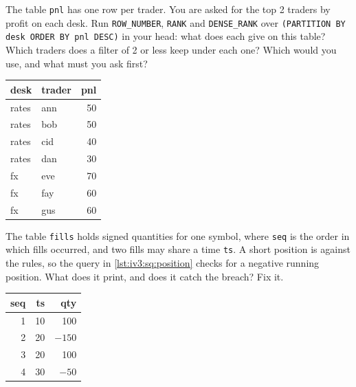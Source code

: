 \begin{question}\label{iq:iv3:sql-and-data:8}
The table \texttt{pnl} has one row per trader. You are asked for the top 2 traders by profit on each desk. Run \texttt{ROW\_NUMBER}, \texttt{RANK} and \texttt{DENSE\_RANK} over \texttt{(PARTITION BY desk ORDER BY pnl DESC)} in your head: what does each give on this table? Which traders does a filter of 2 or less keep under each one? Which would you use, and what must you ask first?
\begin{center}\small
\begin{tabular}{llr}
desk & trader & pnl\\\hline
rates & ann & 50\\
rates & bob & 50\\
rates & cid & 40\\
rates & dan & 30\\
fx & eve & 70\\
fx & fay & 60\\
fx & gus & 60
\end{tabular}
\end{center}
\end{question}

\begin{question}\label{iq:iv3:sql-and-data:9}
The table \texttt{fills} holds signed quantities for one symbol, where \texttt{seq} is the order in which fills occurred, and two fills may share a time \texttt{ts}. A short position is against the rules, so the query in \cref{lst:iv3:sq:position} checks for a negative running position. What does it print, and does it catch the breach? Fix it.
\begin{center}\small
\begin{tabular}{rrr}
seq & ts & qty\\\hline
1 & 10 & 100\\
2 & 20 & $-150$\\
3 & 20 & 100\\
4 & 30 & $-50$
\end{tabular}
\end{center}
\label{lst:iv3:sq:position}
\end{question}


